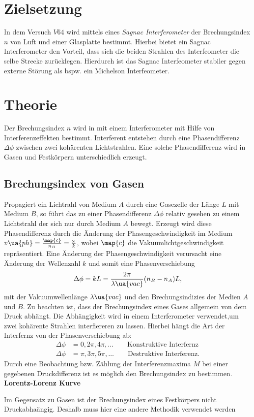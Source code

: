 \setcounter{page}{1}
\section*{Zielsetzung}
In dem Versuch $V64$ wird mittels eines \emph{Sagnac Interferometer}
der Brechungsindex $n$ von Luft und einer Glasplatte bestimmt.
Hierbei bietet ein Sagnac Interferometer den Vorteil, dass sich
die beiden Strahlen des Interfeometer die selbe Strecke zurücklegen.
Hierdurch ist das Sagnac Interfeometer stabiler gegen externe Störung
als bspw. ein Michelson Interfeometer.

\section{Theorie}
Der Brechungsindex $n$ wird in mit einem Interferometer mit Hilfe von
Interferenzeffekten bestimmt. Interferent entstehen durch
eine Phasendifferenz $\Delta\phi$ zwischen zwei kohärenten Lichtstrahlen.
Eine solche Phasendifferenz wird in Gasen und Festkörpern unterschiedlich erzeugt.

\subsection{Brechungsindex von Gasen}
Propagiert ein Lichtrahl von Medium $A$ durch eine Gasezelle der Länge $L$ mit Medium $B$,
so führt das zu einer Phasendifferenz $\Delta\phi$ relativ gesehen zu einem Lichtstrahl der sich
nur durch Medium $A$ bewegt. Erzeugt wird diese Phasendifferenz durch die Änderung der
Phasengeschwindigkeit im Medium $v\ua{ph}=\frac{\map{c}}{n_B}=\frac{\omega}{k}$, wobei $\map{c}$
die Vakuumlichtgeschwindigkeit repräsentiert. Eine Änderung der Phasengeschwindigkeit
verursacht eine Änderung der Wellenzahl $k$ und somit eine Phasenverschiebung
\begin{equation}
  \label{eq:phase_shit_gases}
\Delta\phi = kL = \frac{2\pi}{\lambda\ua{vac}}(n_B-n_A)L,
\end{equation}
mit der Vakuumwellenlänge $\lambda\ua{vac}$ und den Brechungsindizies der
Medien $A$ und $B$.
Zu beachten ist, dass der Brechungsindex eines Gases allgemein von dem Druck abhängt.
Die Abhängigkeit wird in einem Interferometer verwendet,um zwei kohärente Strahlen
interfiereren zu lassen. Hierbei hängt die Art der Interfernz von der Phasenverschiebung ab:
\begin{align}
  \Delta\phi &=0,2\pi,4\pi,\dots \qquad \text{Konstruktive Interfernz} \label{eq:Konstruktive}\\
  \Delta\phi &= \pi, 3\pi, 5\pi,\dots \qquad \text{Destruktive Interferenz}. \label{eq:Destruktive}
\end{align}
Durch eine Beobachtung bzw. Zählung der Interferenzmaxima $M$ bei einer gegebenen Druckdifferenz
ist es möglich den Brechungsindex zu bestimmen.
\textbf{Lorentz-Lorenz Kurve}

Im Gegensatz zu Gasen ist der Brechungsindex eines Festkörpers nicht Druckabhaängig.
Deshalb muss hier eine andere Methodik verwendet werden
